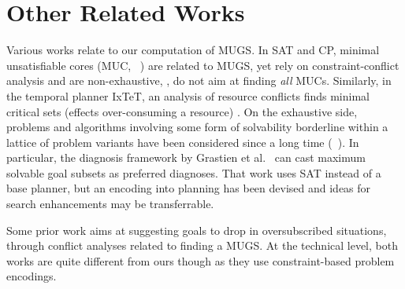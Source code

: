 \section{Other Related Works}
\label{related}



Various works relate to our computation of MUGS. In SAT and CP,
minimal unsatisfiable cores (MUC,
\eg\ \cite{chinneck:2007,laborie:ecai-14}) are related to MUGS, yet
rely on constraint-conflict analysis and are non-exhaustive, \ie, do
not aim at finding \emph{all} MUCs. Similarly, in the temporal planner
IxTeT, an analysis of resource conflicts finds minimal critical sets
(effects over-consuming a resource)
\cite{laborie:ghallab:ijcai-95}. On the exhaustive side, problems and
algorithms involving some form of solvability borderline within a
lattice of problem variants have been considered since a long time
(\eg\ \cite{dekleer:ai-86:atms,reiter:ai-87}). In particular, the
diagnosis framework by Grastien et
al.\  can cast
maximum solvable goal subsets as preferred diagnoses. That work uses
SAT instead of a base planner, but an encoding into planning has been
devised and ideas for search enhancements may be transferrable.
%

Some prior work \cite{yu:etal:jair-17,lauffer:topcu:xaip-19} aims at
suggesting goals to drop in oversubscribed situations, through
conflict analyses related to finding a MUGS. At the technical level,
both works are quite different from ours though as they use
constraint-based problem encodings.

